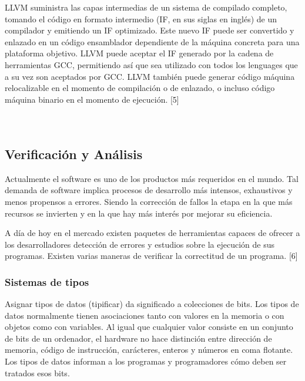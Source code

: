 LLVM suministra las capas intermedias de un sistema de compilado completo, tomando el c\'odigo en formato intermedio (IF, en sus siglas en ingl\'es) de un compilador y emitiendo un IF optimizado. Este nuevo IF puede ser convertido y enlazado en un c\'odigo ensamblador dependiente de la m\'aquina concreta para una plataforma objetivo. LLVM puede aceptar el IF generado por la cadena de herramientas GCC, permitiendo as\'i que sea utilizado con todos los lenguages que a su vez son aceptados por GCC. LLVM tambi\'en puede generar c\'odigo m\'aquina relocalizable en el momento de compilaci\'on o de enlazado, o incluso c\'odigo m\'aquina binario en el momento de ejecuci\'on. [5] \\ \\ \\ 

\subsection{Verificaci\'on y An\'alisis}

Actualmente el software es uno de los productos m\'as requeridos en el mundo. Tal demanda de software implica procesos de desarrollo m\'as intensos, exhaustivos y menos propensos a errores. Siendo la correcci\'on de fallos la etapa en la que m\'as recursos se invierten y en la que hay m\'as inter\'es por mejorar su eficiencia. 

A d\'ia de hoy en el mercado existen paquetes de herramientas capaces de ofrecer a los desarrolladores detecci\'on de errores y estudios sobre la ejecuci\'on de sus programas. Existen varias maneras de verificar la correctitud de un programa. [6]

\subsubsection*{Sistemas de tipos}

Asignar tipos de datos (tipificar) da significado a colecciones de bits. Los tipos de datos normalmente tienen asociaciones tanto con valores en la memoria o con objetos como con variables. Al igual que cualquier valor consiste en un conjunto de bits de un ordenador, el hardware no hace distinci\'on entre direcci\'on de memoria, c\'odigo de instrucci\'on, car\'acteres, enteros y n\'umeros en coma flotante. Los tipos de datos informan a los programas y programadores c\'omo deben ser tratados esos bits.

